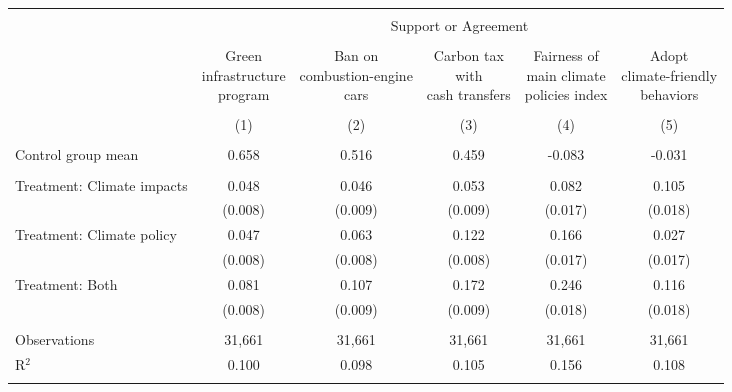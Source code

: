 
\begin{tabular}{@{\extracolsep{5pt}}lccccc} 
\\[-1.8ex]\hline 
\hline \\[-1.8ex] 
 & \multicolumn{5}{c}{Support or Agreement} \\ 
\cline{2-6} 
\\[-1.8ex] & \makecell{Green\\infrastructure\\program} & \makecell{Ban on\\combustion-engine\\cars} & \makecell{Carbon tax\\with\\cash transfers} & \makecell{Fairness of\\main climate\\policies index} & \makecell{Adopt\\climate-friendly\\behaviors} \\ 
\\[-1.8ex] & (1) & (2) & (3) & (4) & (5)\\ 
\hline \\[-1.8ex] 
Control group mean & 0.658 & 0.516 & 0.459 & -0.083 & -0.031  \\ \hline \\[-1.8ex]
 Treatment: Climate impacts & 0.048 & 0.046 & 0.053 & 0.082 & 0.105 \\ 
  & (0.008) & (0.009) & (0.009) & (0.017) & (0.018) \\ 
  Treatment: Climate policy & 0.047 & 0.063 & 0.122 & 0.166 & 0.027 \\ 
  & (0.008) & (0.008) & (0.008) & (0.017) & (0.017) \\ 
  Treatment: Both & 0.081 & 0.107 & 0.172 & 0.246 & 0.116 \\ 
  & (0.008) & (0.009) & (0.009) & (0.018) & (0.018) \\ 
 \hline \\[-1.8ex] 

Observations & 31,661 & 31,661 & 31,661 & 31,661 & 31,661 \\ 
R$^{2}$ & 0.100 & 0.098 & 0.105 & 0.156 & 0.108 \\ 
\hline 
\hline \\[-1.8ex] 
\end{tabular} 